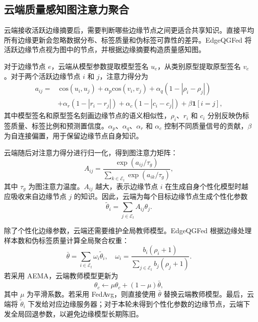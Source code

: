 \documentclass[journal]{IEEEtran}
\begin{document}
\subsection{云端质量感知图注意力聚合}
\label{subsec:graph_aggregation}

云端接收活跃边缘摘要后，需要判断哪些边缘节点之间更适合共享知识。直接平均所有边缘更新会忽略数据分布、标签质量和伪标签可靠性的差异。EdgeQGFed 将活跃边缘节点视为图中的节点，并根据边缘摘要构造质量感知图。

对于边缘节点 $e$，云端从模型参数提取模型签名 $u_e$，从类别原型提取原型签名 $v_e$。对于两个活跃边缘节点 $i$ 和 $j$，注意力得分为
\begin{align}
    a_{ij} =
    &\ \mathrm{cos}(u_i,u_j)
    + \alpha_p \mathrm{cos}(v_i,v_j)
    + \alpha_q (1-|\rho_i-\rho_j|) \nonumber \\
    &+ \alpha_r (1-|r_i-r_j|)
    + \alpha_c (1-|c_i-c_j|)
    + \beta \mathbf{1}[i=j],
    \label{eq:attention_score}
\end{align}
其中模型签名和原型签名刻画边缘节点的语义相似性，$\rho_i$、$r_i$ 和 $c_i$ 分别反映伪标签质量、标签比例和预测置信度。$\alpha_p$、$\alpha_q$、$\alpha_r$ 和 $\alpha_c$ 控制不同质量信号的贡献，$\beta$ 为自连接偏置，用于保留边缘节点自身知识。

云端随后对注意力得分进行归一化，得到图注意力矩阵：
\begin{equation}
    A_{ij} =
    \frac{\exp(a_{ij}/\tau_g)}
    {\sum_{k\in\mathcal{E}_t}\exp(a_{ik}/\tau_g)},
    \label{eq:attention_matrix}
\end{equation}
其中 $\tau_g$ 为图注意力温度。$A_{ij}$ 越大，表示边缘节点 $i$ 在生成自身个性化模型时越应吸收来自边缘节点 $j$ 的知识。因此，云端为每个目标边缘节点生成个性化参数
\begin{equation}
    \tilde{\theta}_i =
    \sum_{j\in\mathcal{E}_t} A_{ij}\theta_j.
    \label{eq:personalized_param}
\end{equation}

除了个性化边缘参数，云端还需要维护全局教师模型。EdgeQGFed 根据边缘处理样本数和伪标签质量计算全局聚合权重：
\begin{equation}
    \bar{\theta} =
    \sum_{i\in\mathcal{E}_t}
    \omega_i \tilde{\theta}_i,
    \quad
    \omega_i =
    \frac{b_i(\rho_i+1)}
    {\sum_{j\in\mathcal{E}_t} b_j(\rho_j+1)}.
    \label{eq:global_param}
\end{equation}
若采用 AEMA，云端教师模型更新为
\begin{equation}
    \theta_c \leftarrow
    \mu \theta_c + (1-\mu)\bar{\theta},
    \label{eq:ema}
\end{equation}
其中 $\mu$ 为平滑系数。若采用 FedAvg，则直接使用 $\bar{\theta}$ 替换云端教师模型。最后，云端将 $\tilde{\theta}_i$ 下发给对应边缘服务器；对于本轮未得到个性化参数的边缘节点，云端下发全局回退参数，以避免边缘模型长期陈旧。
\end{document}
